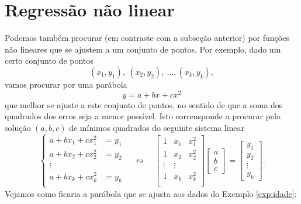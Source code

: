 \documentclass[../livro.tex]{subfiles}  %
\begin{document}
\section{Regressão não linear}


Podemos também procurar (em contraste com a subseção anterior) por funções não lineares que se ajustem a um conjunto de pontos. Por exemplo, dado um certo conjunto de pontos
\begin{equation}
(x_1, y_1), \ (x_2, y_2), \ \dots, (x_k, y_k),
\end{equation} vamos procurar por uma parábola
\begin{equation}
y = a + bx + cx^2
\end{equation} que melhor se ajuste a este conjunto de pontos, no sentido de que a soma dos quadrados dos erros seja a menor possível. Isto corrensponde a procurar pela solução $(a,b, c)$ de mínimos quadrados do seguinte sistema linear
\begin{equation}
\left\{
  \begin{array}{rl}
    a + b x_1 + c x_1^2 &\!\!\!\!\!= y_1  \\
    a + b x_2 + c x_2^2 &\!\!\!\!\!= y_2  \\
    \vdots &  \\
    a + b x_k + c x_k^2 &\!\!\!\!\!= y_k  \\
  \end{array}
\right. \quad \leftrightsquigarrow  \quad
\begin{bmatrix}
  1 & x_1 & x_1^2 \\
  1 & x_2 & x_2^2 \\
  \vdots & \vdots \\
  1 & x_k & x_k^2 \\
\end{bmatrix}
\begin{bmatrix}
  a \\ b \\ c
\end{bmatrix} =
\begin{bmatrix}
  y_1 \\ y_2 \\ \vdots \\ y_k
\end{bmatrix}.
\end{equation} Vejamos como ficaria a parábola que se ajusta aos dados do Exemplo \ref{exp:idade}:
\end{document}
